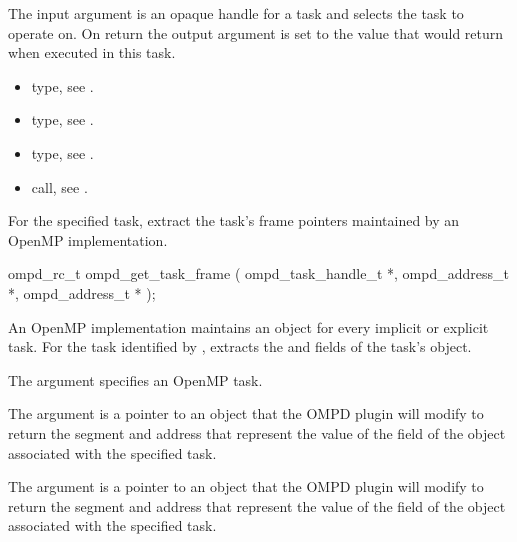 \argdesc
The input argument  is an opaque handle for a task and selects the task to operate on.
On return the output argument  is set to the value that  would return when
executed in this task.

\crossreferences
\begin{itemize}
  \item {} type, see .
	\item {} type, see .
	\item {} type, see .
	\item {} call, see .
\end{itemize}



%
\label{subsubsubsec:ompd_get_task_frame}
\summary
For the specified task, extract the task's frame pointers maintained by an OpenMP implementation.

\format
\begin{cspecific}
\begin{ompSyntax}
ompd_rc_t ompd_get_task_frame (
  ompd_task_handle_t *,
  ompd_address_t *,
  ompd_address_t *
);
\end{ompSyntax}
\end{cspecific}

\descr
An OpenMP implementation  maintains an  object for every implicit or explicit task.
For the task identified by ,  extracts
the  and  fields of the task's  object.

\argdesc

The argument  specifies an OpenMP task.

The argument  is a pointer to an  object that the OMPD plugin will
modify to return the segment and address that represent the value of the 
field of the  object associated with the specified task.

The argument  is a pointer to an  object that the OMPD plugin will
modify to return the segment and address that represent the value of the 
field of the  object associated with the specified task.

